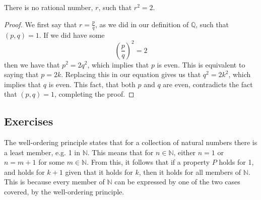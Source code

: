 \begin{theorem}
There is no rational number, $r$, such that $r^2 = 2$.
\begin{proof}
We first say that $r = \frac{p}{q}$, as we did in our definition of $\mathbb{Q}$, such that $(p, q) = 1$. If we did have some
\[ \left(\frac{p}{q}\right)^2 = 2 \]
then we have that $p^2 = 2q^2$, which implies that $p$ is even. This is equivalent to saying that $p = 2k$. Replacing this in our equation gives us that $q^2 = 2k^2$, which implies that $q$ is even. This fact, that both $p$ and $q$ are even, contradicts the fact that $(p, q) = 1$, completing the proof.
\end{proof}
\end{theorem}

\subsection{Exercises}
\begin{problem}[2-10]
The well-ordering principle states that for a collection of natural numbers there is a least member, e.g. 1 in $\mathbb{N}$. This means that for $n \in \mathbb{N}$, either $n = 1$ or $n = m + 1$ for some $m \in \mathbb{N}$. From this, it follows that if a property $P$ holds for 1, and holds for $k + 1$ given that it holds for $k$, then it holds for all members of $\mathbb{N}$. This is because every member of $\mathbb{N}$ can be expressed by one of the two cases covered, by the well-ordering principle.
\end{problem}

